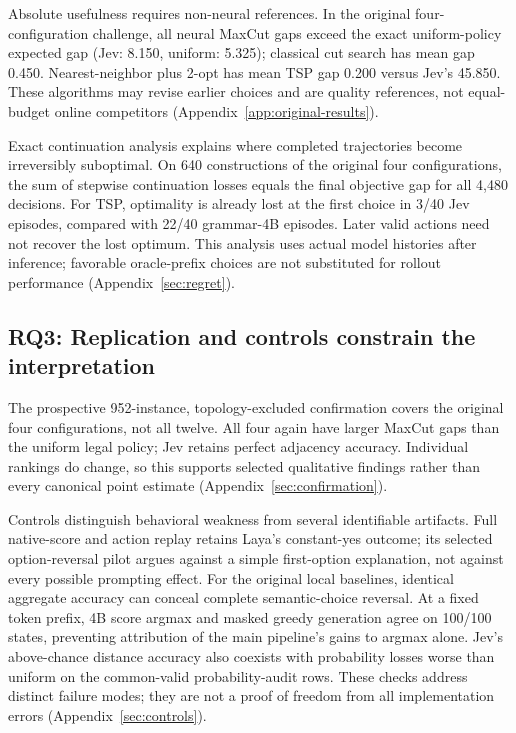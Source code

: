 Absolute usefulness requires non-neural references. In the original
four-configuration challenge, all neural MaxCut gaps exceed the exact
uniform-policy expected gap (Jev: 8.150, uniform: 5.325); classical cut
search has mean gap 0.450. Nearest-neighbor plus 2-opt has mean TSP gap
0.200 versus Jev's 45.850.
These algorithms may revise earlier choices and are quality references,
not equal-budget online competitors (Appendix~\ref{app:original-results}).

Exact continuation analysis explains where completed trajectories become
irreversibly suboptimal. On 640 constructions of the original four
configurations, the sum of stepwise continuation losses equals the final
objective gap for all 4,480 decisions. For TSP, optimality is already lost
at the first choice in 3/40 Jev episodes, compared with 22/40 grammar-4B
episodes. Later valid actions need not recover the lost optimum.
This analysis uses actual model histories after inference; favorable
oracle-prefix choices are not substituted for rollout performance
(Appendix~\ref{sec:regret}).

\subsection{RQ3: Replication and controls constrain the interpretation}
The prospective 952-instance, topology-excluded confirmation covers the
original four configurations, not all twelve. All four again have larger
MaxCut gaps than the uniform legal policy; Jev
retains perfect adjacency accuracy. Individual rankings do change, so this
supports selected qualitative findings rather than every canonical
point estimate (Appendix~\ref{sec:confirmation}).

Controls distinguish behavioral weakness from several identifiable
artifacts. Full native-score and action replay retains Laya's constant-yes
outcome; its selected option-reversal pilot argues against a simple
first-option explanation, not against every possible prompting effect.
For the original local baselines, identical aggregate accuracy can conceal
complete semantic-choice reversal. At a fixed token prefix, 4B score argmax
and masked greedy generation agree on 100/100 states, preventing attribution
of the main pipeline's gains to argmax alone. Jev's above-chance distance
accuracy also coexists with probability losses worse than uniform on the
common-valid probability-audit rows. These checks address distinct failure
modes; they are not a proof of freedom from all implementation errors
(Appendix~\ref{sec:controls}).

